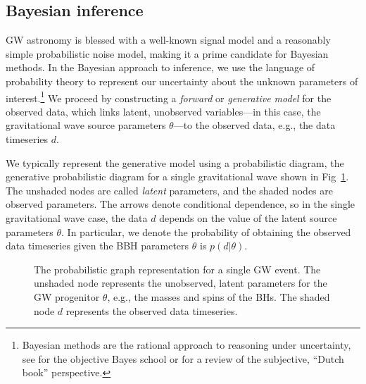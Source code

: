 \begin{refsection}
\subsection{Bayesian inference}

\Ac{GW} astronomy is blessed with a well-known signal model and a reasonably simple probabilistic noise model, making it a prime candidate for Bayesian methods. In the Bayesian approach to inference, we use the language of probability theory to represent our uncertainty about the unknown parameters of interest.\footnote{Bayesian methods are the rational approach to reasoning under uncertainty, see \citet{Jaynes:2003jaq} for the objective Bayes school or \citet{Hajek:2008dba} for a review of the subjective, ``Dutch book'' perspective.} We proceed by constructing a \textit{forward} or \textit{generative model} for the observed data, which links latent, unobserved variables---in this case, the gravitational wave source parameters $\theta$---to the observed data, e.g., the data timeseries $d$. 

We typically represent the generative model using a probabilistic diagram, the generative probabilistic diagram for a single gravitational wave shown in Fig~\ref{fig: dag single gw}. The unshaded nodes are called \textit{latent} parameters, and the shaded nodes are observed parameters. The arrows denote conditional dependence, so in the single gravitational wave case, the data $d$ depends on the value of the latent source parameters $\theta$. In particular, we denote the probability of obtaining the observed data timeseries given the \ac{BBH} parameters $\theta$ is $p(d|\theta)$. 


\begin{figure}[htbp]
    \centering
    \caption{The probabilistic graph representation for a single \ac{GW} event. The unshaded node represents the unobserved, latent parameters for the \ac{GW} progenitor $\theta$, e.g., the masses and spins of the \acp{BH}. The shaded node $d$ represents the observed data timeseries.}
    \label{fig: dag single gw}
\end{figure}


\end{refsection}
